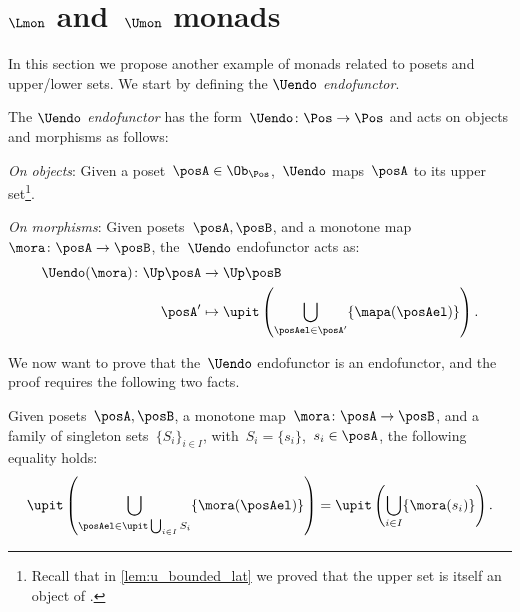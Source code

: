 \section{$\Lmon$ and~$\Umon$ monads}
In this section we propose another example of monads related to posets and upper/lower sets. We start by defining the \emph{$\Uendo$ endofunctor}.
\begin{definition}
  \label{def:Uendo}
  The \emph{$\Uendo$ endofunctor} has the form~$\Uendo \colon \Pos \to \Pos$ and acts on objects and morphisms as follows:
  \begin{compactenum}
    \item \emph{On objects}: Given a poset~$\posA \in \Ob_\Pos$,~$\Uendo$ maps~$\posA$ to its upper set\footnote{Recall that in \cref{lem:u_bounded_lat} we proved that the upper set is itself an object of \Pos.}.
    \item \emph{On morphisms}: Given posets~$\posA,\posB$, and a monotone map~$\mora \colon \posA\to \posB$, the~$\Uendo$ endofunctor acts as:
    \begin{equation}
      \begin{aligned}
        \Uendo(\mora)\colon \Up \posA&\to \Up \posB\\
        \posA'&\mapsto \upit \left( \bigcup_{\posAel\in \posA'} \{\mapa(\posAel)\}\right).
      \end{aligned}
    \end{equation}
  \end{compactenum}
\end{definition}
We now want to prove that the~$\Uendo$ endofunctor is an endofunctor, and the proof requires the following two facts.

\begin{lemma}
  \label{lem:unpack_u_functor}
  Given posets~$\posA,\posB$, a monotone map~$\mora \colon \posA \to \posB$, and a family of singleton sets~$\{S_i\}_{i\in I}$, with~$S_i=\{s_i\}$,~$s_i\in \posA$, the following equality holds:
  \begin{equation}
    \label{eq:lemma_unpack}
    \upit \left( \bigcup_{\posAel \in \upit \bigcup_{i\in I}S_i}\{\mora(\posAel)\}\right)= \upit \left( \bigcup_{i\in I} \{\mora(s_i)\}\right).
  \end{equation}
\end{lemma}


